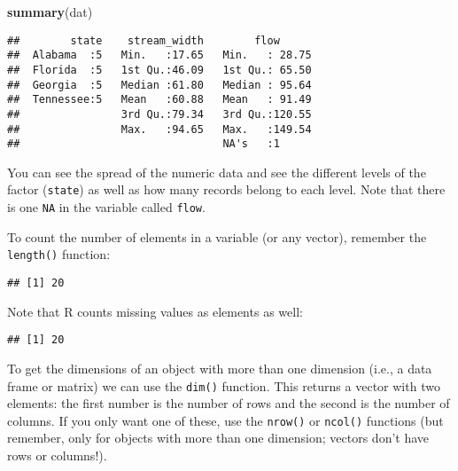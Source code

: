 \documentclass[]{book}
\newenvironment{Shaded}{\begin{snugshade}}{\end{snugshade}}
\newcommand{\KeywordTok}[1]{\textcolor[rgb]{0.13,0.29,0.53}{\textbf{#1}}}
\newcommand{\OperatorTok}[1]{\textcolor[rgb]{0.81,0.36,0.00}{\textbf{#1}}}
\newcommand{\NormalTok}[1]{#1}
\theoremstyle{definition}
\theoremstyle{definition}
\theoremstyle{definition}
\theoremstyle{remark}
\begin{document}
\begin{Shaded}
\begin{Highlighting}[]
\KeywordTok{summary}\NormalTok{(dat)}
\end{Highlighting}
\end{Shaded}

\begin{verbatim}
##        state    stream_width        flow       
##  Alabama  :5   Min.   :17.65   Min.   : 28.75  
##  Florida  :5   1st Qu.:46.09   1st Qu.: 65.50  
##  Georgia  :5   Median :61.80   Median : 95.64  
##  Tennessee:5   Mean   :60.88   Mean   : 91.49  
##                3rd Qu.:79.34   3rd Qu.:120.55  
##                Max.   :94.65   Max.   :149.54  
##                                NA's   :1
\end{verbatim}

You can see the spread of the numeric data and see the different levels
of the factor (\texttt{state}) as well as how many records belong to
each level. Note that there is one \texttt{NA} in the variable called
\texttt{flow}.

To count the number of elements in a variable (or any vector), remember
the \texttt{length()} function:

\begin{Shaded}
\end{Shaded}

\begin{verbatim}
## [1] 20
\end{verbatim}

Note that R counts missing values as elements as well:

\begin{Shaded}
\end{Shaded}

\begin{verbatim}
## [1] 20
\end{verbatim}

To get the dimensions of an object with more than one dimension (i.e., a
data frame or matrix) we can use the \texttt{dim()} function. This
returns a vector with two elements: the first number is the number of
rows and the second is the number of columns. If you only want one of
these, use the \texttt{nrow()} or \texttt{ncol()} functions (but
remember, only for objects with more than one dimension; vectors don't
have rows or columns!).
\end{document}
